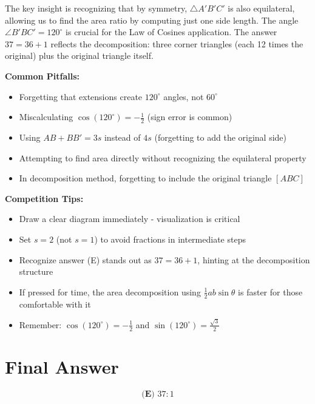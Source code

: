 \documentclass[11pt]{article}
\begin{document}
\begin{keyinsightbox}
The key insight is recognizing that by symmetry, $\triangle A'B'C'$ is also equilateral, allowing us to find the area ratio by computing just one side length. The angle $\angle B'BC' = 120^{\circ}$ is crucial for the Law of Cosines application. The answer $37 = 36 + 1$ reflects the decomposition: three corner triangles (each 12 times the original) plus the original triangle itself.
\end{keyinsightbox}

\begin{warningbox}
\textbf{Common Pitfalls:}
\begin{itemize}
    \item Forgetting that extensions create $120^{\circ}$ angles, not $60^{\circ}$
    \item Miscalculating $\cos(120^{\circ}) = -\frac{1}{2}$ (sign error is common)
    \item Using $AB + BB' = 3s$ instead of $4s$ (forgetting to add the original side)
    \item Attempting to find area directly without recognizing the equilateral property
    \item In decomposition method, forgetting to include the original triangle $[ABC]$
\end{itemize}
\end{warningbox}

\begin{tipbox}
\textbf{Competition Tips:}
\begin{itemize}
    \item Draw a clear diagram immediately - visualization is critical
    \item Set $s = 2$ (not $s = 1$) to avoid fractions in intermediate steps
    \item Recognize answer (E) stands out as $37 = 36 + 1$, hinting at the decomposition structure
    \item If pressed for time, the area decomposition using $\frac{1}{2}ab\sin\theta$ is faster for those comfortable with it
    \item Remember: $\cos(120^{\circ}) = -\frac{1}{2}$ and $\sin(120^{\circ}) = \frac{\sqrt{3}}{2}$
\end{itemize}
\end{tipbox}

\section*{Final Answer}
\[\boxed{\textbf{(E) } 37:1}\]
\end{document}
